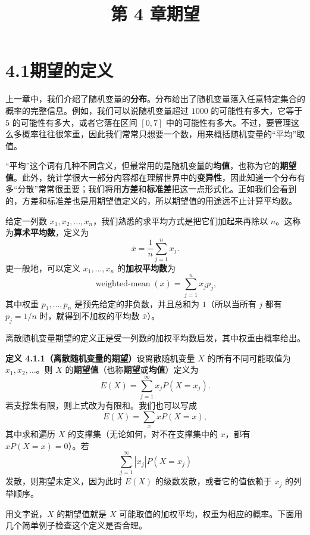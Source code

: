 \documentclass[UTF8, 12pt, fontset=fandol, oneside]{ctexart}
\title{第 4 章\quad 期望}
\author{}
\date{}
\begin{document}
\maketitle

\section*{4.1\quad 期望的定义}

上一章中，我们介绍了随机变量的\textbf{分布}。分布给出了随机变量落入任意特定集合的概率的完整信息。例如，我们可以说随机变量超过 $1000$ 的可能性有多大，它等于 $5$ 的可能性有多大，或者它落在区间 $[0,7]$ 中的可能性有多大。不过，要管理这么多概率往往很笨重，因此我们常常只想要一个数，用来概括随机变量的“平均”取值。

“平均”这个词有几种不同含义，但最常用的是随机变量的\textbf{均值}，也称为它的\textbf{期望值}。此外，统计学很大一部分内容都在理解世界中的\textbf{变异性}，因此知道一个分布有多“分散”常常很重要；我们将用\textbf{方差}和\textbf{标准差}把这一点形式化。正如我们会看到的，方差和标准差也是用期望值定义的，所以期望值的用途远不止计算平均数。

给定一列数 $x_1,x_2,\ldots,x_n$，我们熟悉的求平均方式是把它们加起来再除以 $n$。这称为\textbf{算术平均数}，定义为
\[
  \bar{x}=\frac{1}{n}\sum_{j=1}^n x_j.
\]
更一般地，可以定义 $x_1,\ldots,x_n$ 的\textbf{加权平均数}为
\[
  \operatorname{weighted\mbox{-}mean}(x)=\sum_{j=1}^n x_jp_j,
\]
其中权重 $p_1,\ldots,p_n$ 是预先给定的非负数，并且总和为 $1$（所以当所有 $j$ 都有 $p_j=1/n$ 时，就得到不加权的平均数 $\bar{x}$）。

离散随机变量期望的定义正是受一列数的加权平均数启发，其中权重由概率给出。

\noindent\textbf{定义 4.1.1（离散随机变量的期望）}\quad 设离散随机变量 $X$ 的所有不同可能取值为 $x_1,x_2,\ldots$。则 $X$ 的\textbf{期望值}（也称\textbf{期望}或\textbf{均值}）定义为
\[
  E(X)=\sum_{j=1}^{\infty}x_jP(X=x_j).
\]
若支撑集有限，则上式改为有限和。我们也可以写成
\[
  E(X)=\sum_x xP(X=x),
\]
其中求和遍历 $X$ 的支撑集（无论如何，对不在支撑集中的 $x$，都有 $xP(X=x)=0$）。若
\[
  \sum_{j=1}^{\infty}|x_j|P(X=x_j)
\]
发散，则期望未定义，因为此时 $E(X)$ 的级数发散，或者它的值依赖于 $x_j$ 的列举顺序。

用文字说，$X$ 的期望值就是 $X$ 可能取值的加权平均，权重为相应的概率。下面用几个简单例子检查这个定义是否合理。
\end{document}
